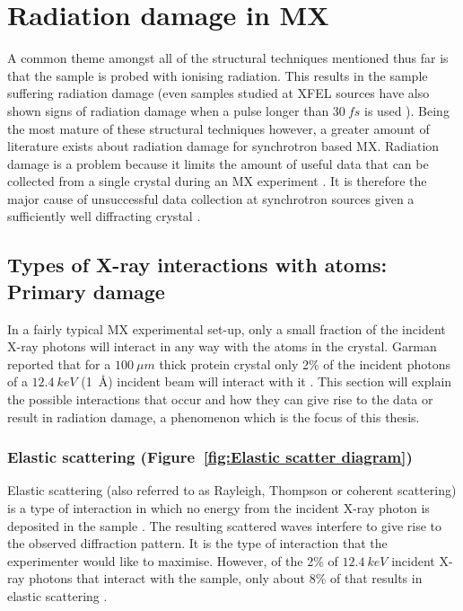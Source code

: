 \section{Radiation damage in MX}
\label{sec:Radiation damage in MX}
    A common theme amongst all of the structural techniques mentioned thus far is that the sample is probed with ionising radiation.
    This results in the sample suffering radiation damage (even samples studied at XFEL sources have also shown signs of radiation damage when a pulse longer than $30\ fs$ is used \cite{nass2015indications}).
    Being the most mature of these structural techniques however, a greater amount of literature exists about radiation damage for synchrotron based MX.
    Radiation damage is a problem because it limits the amount of useful data that can be collected from a single crystal during an MX experiment \cite{garman2010}.
    It is therefore the major cause of unsuccessful data collection at synchrotron sources given a sufficiently well diffracting crystal \cite{zeldin2013dwd}.

    \subsection{Types of X-ray interactions with atoms: Primary damage}
    \label{sub:Types of X-ray interactions with atoms: Primary damage}
        In a fairly typical MX experimental set-up, only a small fraction of the incident X-ray photons will interact in any way with the atoms in the crystal. Garman reported that for a $100\ \mu m$ thick protein crystal only 2\% of the incident photons of a $12.4\ keV$ (1\ \AA) incident beam will interact with it \cite{garman2010}.
        This section will explain the possible interactions that occur and how they can give rise to the data or result in radiation damage, a phenomenon which is the focus of this thesis.

        \subsubsection{Elastic scattering (Figure~\ref{fig:Elastic scatter diagram})}
        \label{subs:Elastic scattering}
            Elastic scattering (also referred to as Rayleigh, Thompson or coherent scattering) is a type of interaction in which no energy from the incident X-ray photon is deposited in the sample \cite{nave1995}.
            The resulting scattered waves interfere to give rise to the observed diffraction pattern.
            It is the type of interaction that the experimenter would like to maximise. However, of the 2\% of $12.4\ keV$ incident X-ray photons that interact with the sample, only about 8\% of that results in elastic scattering \cite{ravelli2006radiation}.

